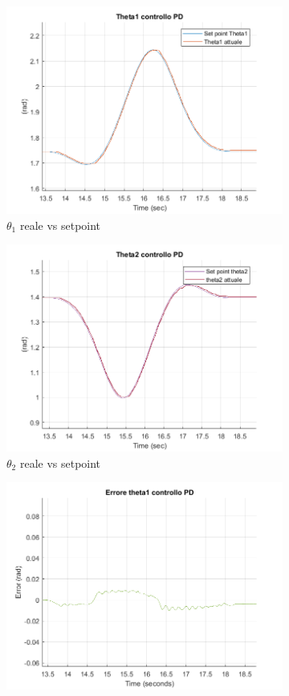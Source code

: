 \begin{figure}[!ht]
\begin{subfigure}{.5\textwidth}
  \centering
  \includegraphics[width=.8\linewidth]{Immagini/Traiettorie/Theta1PD}  
  \caption{$\theta_1$ reale vs setpoint}
  \label{fig:sub-pd1p}
\end{subfigure}
\begin{subfigure}{.5\textwidth}
  \centering
  \includegraphics[width=.8\linewidth]{Immagini/Traiettorie/Theta2PD}  
  \caption{$\theta_2$ reale vs setpoint}
  \label{fig:sub-pd2p}
\end{subfigure}
\begin{subfigure}{.5\textwidth}
  \centering
  \includegraphics[width=.8\linewidth]{Immagini/Traiettorie/ErroreTheta1PD}  

\end{subfigure}
\end{figure}
